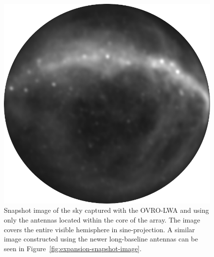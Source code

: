 \begin{bibunit}
\begin{figure}[p]
    \centering
    \includegraphics[width=\textwidth]{figures/chapter2/before-expansion}
    \caption{
        Snapshot image of the sky captured with the OVRO-LWA and using only the antennas located
        within the core of the array. The image covers the entire visible hemisphere in
        sine-projection.  A similar image constructed using the newer long-baseline antennas can be
        seen in Figure~\ref{fig:expansion-snapshot-image}.
    }
    \label{fig:core-snapshot-image}
\end{figure}


\end{bibunit}
